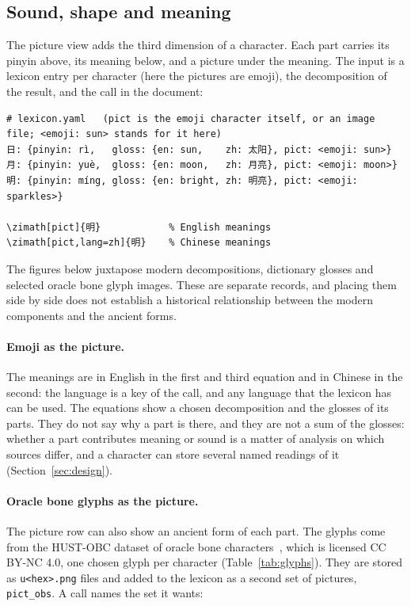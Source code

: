 \documentclass[11pt]{article}
\begin{document}
\subsection{Sound, shape and meaning}
The picture view adds the third dimension of a character. Each part carries its pinyin above, its meaning below, and a picture under the meaning.
The input is a lexicon entry per character (here the pictures are emoji), the decomposition of the result, and the call in the document:

\begin{verbatim}
# lexicon.yaml   (pict is the emoji character itself, or an image file; <emoji: sun> stands for it here)
日: {pinyin: rì,   gloss: {en: sun,    zh: 太阳}, pict: <emoji: sun>}
月: {pinyin: yuè,  gloss: {en: moon,   zh: 月亮}, pict: <emoji: moon>}
明: {pinyin: míng, gloss: {en: bright, zh: 明亮}, pict: <emoji: sparkles>}

\zimath[pict]{明}            % English meanings
\zimath[pict,lang=zh]{明}    % Chinese meanings
\end{verbatim}

\noindent The figures below juxtapose modern decompositions, dictionary glosses and selected oracle bone glyph images. These are separate
records, and placing them side by side does not establish a historical relationship between the modern components and the ancient forms.

\paragraph{Emoji as the picture.}

\noindent The meanings are in English in the first and third equation and in Chinese in the second: the language is a key of the call, and any language
that the lexicon has can be used. The equations show a chosen decomposition and the glosses of its parts. They do not say why a part is there, and
they are not a sum of the glosses: whether a part contributes meaning or sound is a matter of analysis on which sources differ, and a character can store
several named readings of it (Section~\ref{sec:design}).

\paragraph{Oracle bone glyphs as the picture.}
The picture row can also show an ancient form of each part. The glyphs come from the HUST-OBC dataset of oracle bone characters~\cite{hustobc},
which is licensed CC BY-NC 4.0, one chosen glyph per character (Table~\ref{tab:glyphs}). They are stored as \texttt{u<hex>.png} files and added to
the lexicon as a second set of pictures, \texttt{pict\_obs}. A call names the set it wants:
\end{document}

